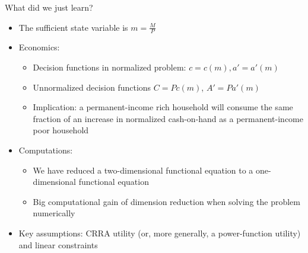 \documentclass[9pt]{beamer}
\newcommand{\bit}{\begin{itemize}}
\newcommand{\eit}{\end{itemize}}
\begin{document}
\begin{frame}{What did we just learn?}

\bit
\setlength\itemsep{1.5em}

\item The sufficient state variable is $m = \frac{M}{P}$


\item Economics:
\bit
\setlength\itemsep{0.5em}
	\item Decision functions in normalized problem: $c=c(m), a'=a'(m)$
	
	\item Unnormalized decision functions $C=Pc(m)$, $A'=Pa'(m)$
	
	\item Implication: a permanent-income rich household will consume the same fraction of an increase in normalized cash-on-hand as a permanent-income poor household
\eit


\item Computations:
\bit
\setlength\itemsep{0.5em}
\item We have reduced a two-dimensional functional equation to a one-dimensional functional equation

\item Big computational gain of dimension reduction when solving the problem numerically
\eit

\item Key assumptions: CRRA utility (or, more generally, a power-function utility) and linear constraints


\eit

\end{frame}
\end{document}
